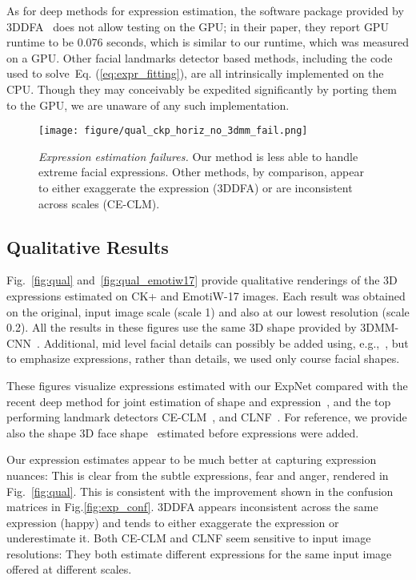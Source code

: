 \documentclass[a4paper, 10pt, conference]{ieeeconf}
\begin{document}
As for deep methods for expression estimation, the software package provided by 3DDFA~\cite{zhu2015} does not allow testing on the GPU; in their paper, they report GPU runtime to be 0.076 seconds, which is similar to our runtime, which was measured on a GPU. Other facial landmarks detector based methods, including the code used to solve~Eq. (\ref{eq:expr_fitting}), are all intrinsically implemented on the CPU. Though they may conceivably be expedited significantly by porting them to the GPU, we are unaware of any such implementation.


\begin{figure}[tb]
\centering
\texttt{[image: figure/qual\_ckp\_horiz\_no\_3dmm\_fail.png]}
\caption{
{\em Expression estimation failures.} Our method is less able to handle extreme facial expressions. Other methods, by comparison, appear to either exaggerate the expression (3DDFA) or are inconsistent across scales (CE-CLM).
}
\label{fig:qual_fail}
\end{figure}

\subsection{Qualitative Results}\label{sec:qual}
Fig.~\ref{fig:qual} and~\ref{fig:qual_emotiw17} provide qualitative renderings of the 3D expressions estimated on CK+ and EmotiW-17 images. Each result was obtained on the original, input image scale (scale 1) and also at our lowest resolution (scale 0.2). All the results in these figures use the same 3D shape provided by 3DMM-CNN~\cite{tran16_3dmm_cnn}. Additional, mid level facial details can possibly be added using, e.g.,~\cite{tran2017extreme}, but to emphasize expressions, rather than details, we used only course facial shapes. 

These figures visualize expressions estimated with our ExpNet compared with the recent deep method for joint estimation of shape and expression~\cite{zhu2015}, and the top performing landmark detectors CE-CLM~\cite{zadeh2016deep}, and CLNF~\cite{baltrusaitis2013constrained}. For reference, we provide also the shape 3D face  shape~\cite{tran16_3dmm_cnn} estimated before expressions were added.


Our expression estimates appear to be much better at capturing expression nuances: This is clear from the subtle expressions, fear and anger, rendered in Fig.~\ref{fig:qual}. This is consistent with the improvement shown in the confusion matrices in Fig.\ref{fig:exp_conf}. 3DDFA appears inconsistent across the same expression (happy) and tends to either exaggerate the expression or underestimate it. Both CE-CLM and CLNF seem sensitive to input image resolutions: They both estimate different expressions for the same input image offered at different scales.
\end{document}
